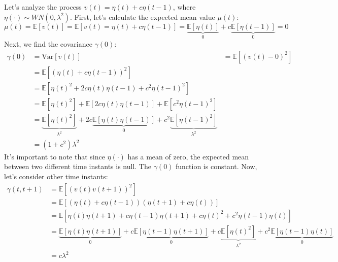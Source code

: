\begin{example}
    Let's analyze the process $v(t)=\eta(t)+c\eta(t-1)$, where $\eta(\cdot) \sim WN(0,\lambda^2)$. 
    First, let's calculate the expected mean value $\mu(t)$: 
    \[\mu(t)=\mathbb{E}\left[v(t)\right]=\mathbb{E}\left[v(t)=\eta(t)+c\eta(t-1)\right]=\underbrace{\mathbb{E}\left[\eta(t)\right]}_0 +c\underbrace{\mathbb{E}\left[\eta(t-1)\right]}_0=0\]
    Next, we find the covariance $\gamma(0)$:
    \begin{align*}
        \gamma(0)       &=\text{Var}\left[v(t)\right]
                        &=\mathbb{E}\left[\left(v(t)-0\right)^2\right] \\
                        &=\mathbb{E}\left[\left(\eta(t)+c\eta(t-1)\right)^2\right] \\
                        &=\mathbb{E}\left[\eta(t)^2+2c\eta(t)\eta(t-1)+c^2\eta(t-1)^2\right] \\
                        &=\mathbb{E}\left[\eta(t)^2\right] + \mathbb{E}\left[2c\eta(t)\eta(t-1)\right] + \mathbb{E}\left[c^2\eta(t-1)^2\right] \\
                        &=\underbrace{\mathbb{E}\left[\eta(t)^2\right]}_{\lambda^2}  + 2c\underbrace{\mathbb{E}\left[\eta(t)\eta(t-1)\right]}_{0} + c^2\underbrace{\mathbb{E}\left[\eta(t-1)^2\right]}_{\lambda^2}  \\
                        &=\left( 1+c^2 \right)\lambda^2
    \end{align*}
    It's important to note that since $\eta(\cdot)$ has a mean of zero, the expected mean between two different time instants is null.
    The $\gamma(0)$ function is constant. 
    Now, let's consider other time instants:
    \begin{align*}
        \gamma(t,t+1)   &=\mathbb{E}\left[\left(v(t)v(t+1)\right)^2\right] \\
                        &=\mathbb{E}\left[\left(\eta(t)+c\eta(t-1)\right)\left(\eta(t+1)+c\eta(t)\right)\right] \\
                        &=\mathbb{E}\left[\eta(t)\eta(t+1)+c\eta(t-1)\eta(t+1)+c\eta(t)^2+c^2\eta(t-1)\eta(t)\right] \\
                        &=\underbrace{\mathbb{E}\left[\eta(t)\eta(t+1)\right]}_{0}  + c\underbrace{\mathbb{E}\left[\eta(t-1)\eta(t+1)\right]}_{0}  + c\underbrace{\mathbb{E}\left[\eta(t)^2\right]}_{\lambda^2}  + c^2\underbrace{\mathbb{E}\left[\eta(t-1)\eta(t)\right]}_{0}  \\
                        &=c\lambda^2
    \end{align*}

\end{example}
